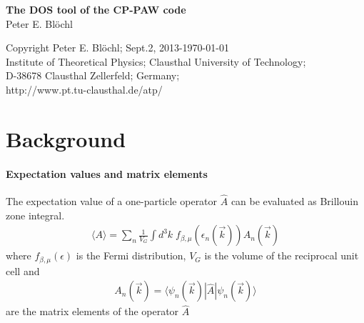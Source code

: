 \documentclass[11pt,a4paper]{report}
\begin{document}
\begin{titlepage}
\begin{center}
\vspace*{3.5cm}
{\huge \textbf{The DOS tool of the CP-PAW code}}\\
\vspace{0.5cm}
{\large Peter E. Bl\"ochl}
\vspace{0.5cm} 
\end{center}

\vfill
\begin{center}
Copyright Peter E. Bl\"ochl; Sept.2, 2013-\today\\
{\small
Institute of Theoretical Physics;
Clausthal University of Technology;\\ 
D-38678 Clausthal Zellerfeld; Germany;\\
http://www.pt.tu-clausthal.de/atp/}
\end{center}
\end{titlepage}
\noindent            
\tableofcontents
\chapter{Background}
\subsubsection{Expectation values and matrix elements}
The expectation value of a one-particle operator $\hat{A}$ can be evaluated
as Brillouin zone integral.
\begin{eqnarray}
\langle{A}\rangle
=\sum_n\frac{1}{V_G}\int d^3k\; f_{\beta,\mu}(\epsilon_n(\vec{k}))
A_{n}(\vec{k})
\end{eqnarray}
where $f_{\beta,\mu}(\epsilon)$ is the Fermi distribution, $V_G$ is
the volume of the reciprocal unit cell and
\begin{eqnarray}
A_{n}(\vec{k})=\langle\psi_n(\vec{k})|\hat{A}|\psi_n(\vec{k})\rangle
\end{eqnarray}
are the matrix elements of the operator $\hat{A}$

\end{document}
